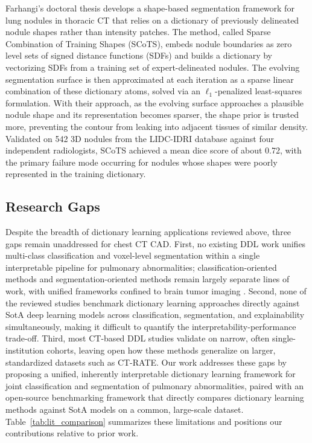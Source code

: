 Farhangi's\cite{farhangi2017scots} doctoral thesis develops a shape-based segmentation framework for lung nodules in thoracic CT that relies on a dictionary
of previously delineated nodule shapes rather than intensity patches. The method, called Sparse Combination of Training
Shapes (SCoTS), embeds nodule boundaries as zero level sets of signed distance functions (SDFs) and builds a dictionary by vectorizing
SDFs from a training set of expert-delineated nodules. The evolving segmentation surface is then approximated at each iteration
as a sparse linear combination of these dictionary atoms, solved via an $\ell_1$-penalized least-squares formulation.
With their approach, as the evolving surface approaches a plausible
nodule shape and its representation becomes sparser, the shape prior is trusted more, preventing the contour from leaking into
adjacent tissues of similar density. Validated on 542 3D nodules from the LIDC-IDRI database against four independent radiologists,
SCoTS achieved a mean dice score of about 0.72, with the primary failure mode occurring for nodules
whose shapes were poorly represented in the training dictionary.

\subsection{Research Gaps}

Despite the breadth of dictionary learning applications reviewed above, three gaps remain unaddressed for chest CT CAD.
First, no existing DDL work unifies multi-class classification and voxel-level segmentation within a single interpretable
pipeline for pulmonary abnormalities; classification-oriented methods \cite{wu2016dictionary,liyanage2022covid}
and segmentation-oriented methods \cite{tong2015discriminative,wang2018tumor} remain largely separate lines of work,
with unified frameworks confined to brain tumor imaging \cite{alshaikhli2016brain,anitha2024brain}. Second, none of the
reviewed studies benchmark dictionary learning approaches directly against SotA deep learning models across classification,
segmentation, and explainability simultaneously, making it difficult to quantify the interpretability-performance trade-off.
Third, most CT-based DDL studies validate on narrow, often single-institution cohorts, leaving open how these methods
generalize on larger, standardized datasets such as CT-RATE. Our work addresses these gaps by proposing a unified,
inherently interpretable dictionary learning framework for joint classification and segmentation of pulmonary abnormalities,
paired with an open-source benchmarking framework that directly compares dictionary learning methods against SotA models
on a common, large-scale dataset. Table~\ref{tab:lit_comparison} summarizes these limitations and positions our contributions relative to prior work.

